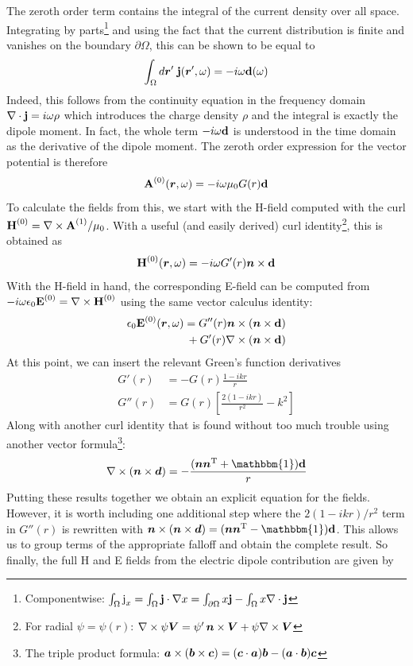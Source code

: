 \documentclass[twocolumn]{gwclass}
\newcommand{\bt}[1]{\text{\textbf{#1}}}
\begin{document}
	The zeroth order term contains the integral of the current density over all space. Integrating by parts\footnote{Componentwise: $\int_\Omega \t{j}_x = \int_\Omega \bt{j}\cdot\nabla x = \int_{\partial\Omega} x\bt{j} - \int_\Omega x\nabla\cdot\bt{j}$} and using the fact that the current distribution is finite and vanishes on the boundary $\partial\Omega$, this can be shown to be equal to
	$$ \int_\Omega d\*r'\;\bt{j}(\*r',\omega) = -i\omega \bt{d}(\omega) $$
	Indeed, this follows from the continuity equation in the frequency domain $\nabla\cdot\bt{j}=i\omega\rho$ which introduces the charge density $\rho$ and the integral is exactly the dipole moment. In fact, the whole term $-i\omega\bt{d}$ is understood in the time domain as the derivative of the dipole moment. The zeroth order expression for the vector potential is therefore
	$$ \bt{A}^{(0)}(\*r,\omega) = -i\omega \mu_0 G(r)\bt{d} $$
	To calculate the fields from this, we start with the H-field computed with the curl $\bt{H}^{(0)} = \nabla\times \bt{A}^{(1)}/\mu_0$. With a useful (and easily derived) curl identity\footnote{For radial $\psi=\psi(r)$: $ \nabla\times \psi\boldsymbol{V} = \psi'\,\boldsymbol{n}\times\boldsymbol{V} + \psi \nabla\times\boldsymbol{V} $}, this is obtained as
	$$ \bt{H}^{(0)}(\*r,\omega) = -i\omega G'(r)\*n\times\bt{d} $$
	With the H-field in hand, the corresponding E-field can be computed from $-i\omega\epsilon_0\bt{E}^{(0)}=\nabla\times\bt{H}^{(0)}$ using the same vector calculus identity:
	\begin{align*}
		\epsilon_0\bt{E}^{(0)}(\*r,\omega) &= G''(r)\*n\times(\*n\times\bt{d}) \\
		 & \:+ G'(r)\nabla\times(\*n\times\bt{d})
	\end{align*}
	At this point, we can insert the relevant Green's function derivatives
\begin{align*}
	G'(r) &= -G(r)\frac{1-ikr}{r} \\
	G''(r)&= G(r) \left[ \frac{2(1 - ikr)}{r^2} - k^2 \right]
\end{align*}
	Along with another curl identity that is found without too much trouble using another vector formula\footnote{The triple product formula: $\boldsymbol{a}\times(\boldsymbol{b}\times\boldsymbol{c}) = (\boldsymbol{c}\cdot\boldsymbol{a})\boldsymbol{b} - (\boldsymbol{a}\cdot\boldsymbol{b})\boldsymbol{c}$}:
	$$ \nabla\times(\*n\times\*d) = -\frac{(\*n\*n^\t{T} + \mathbbm{1})\bt{d}}{r}$$
	Putting these results together we obtain an explicit equation for the fields. However, it is worth including one additional step where the $2(1-ikr)/r^2$ term in $G''(r)$ is rewritten with 	$ \*n\times(\*n\times\*d) = (\*n\*n^\t{T} - \mathbbm{1})\bt{d} $. This allows us to group terms of the appropriate falloff and obtain the complete result. So finally, the full H and E fields from the electric dipole contribution are given by
\end{document}
